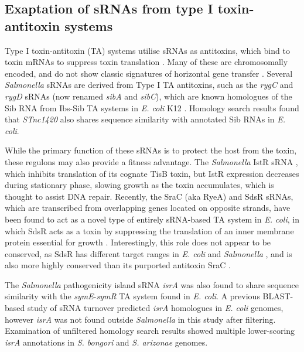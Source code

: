 \subsection{Exaptation of sRNAs from type I toxin-antitoxin systems}

Type I toxin-antitoxin (TA) systems utilise sRNAs as antitoxins, which bind to toxin mRNAs to suppress toxin translation \citep{Brantl2012-ad}. Many of these are chromosomally encoded, and do not show classic signatures of horizontal gene transfer \citep{Fozo2010-xl,Coray2017-sb}. Several \textit{Salmonella} sRNAs are derived from Type I TA antitoxins, such as the \textit{rygC} and \textit{rygD} sRNAs (now renamed \textit{sibA} and \textit{sibC}), which are known homologues of the Sib RNA from Ibs-Sib TA systems in \textit{E. coli} K12 \citep{Hebrard2012-iy,Han2010-hn}. Homology search results found that \textit{STnc1420} also shares sequence similarity with annotated Sib RNAs in \textit{E. coli}. 

While the primary function of these sRNAs is to protect the host from the toxin, these regulons may also provide a fitness advantage. The \textit{Salmonella} IstR sRNA \citep{Vogel2004-ke}, which inhibits translation of its cognate TisB toxin, but IstR expression decreases during stationary phase, slowing growth as the toxin accumulates, which is thought to assist DNA repair. Recently, the SraC (aka RyeA) and SdsR sRNAs, which are transcribed from overlapping genes located on opposite strands, have been found to act as a novel type of entirely sRNA-based TA system in \textit{E. coli}, in which SdsR acts as a toxin by suppressing the translation of an inner membrane protein essential for growth \citep{Choi2018-sl}. Interestingly, this role does not appear to be conserved, as SdsR has different target ranges in \textit{E. coli} and \textit{Salmonella} \citep{Frohlich2016-pr}, and is also more highly conserved than its purported antitoxin SraC \citep{Frohlich2012-bf}.

The \textit{Salmonella} pathogenicity island sRNA \textit{isrA} was also found to share sequence similarity with the \textit{symE}-\textit{symR} TA system found in \textit{E. coli}. A previous BLAST-based study of sRNA turnover \citep{Skippington2012-iv} predicted \textit{isrA} homologues in \textit{E. coli} genomes, however \textit{isrA} was not found outside \textit{Salmonella} in this study after filtering. Examination of unfiltered homology search results showed multiple lower-scoring \textit{isrA} annotations in \textit{S. bongori} and \textit{S. arizonae} genomes.

